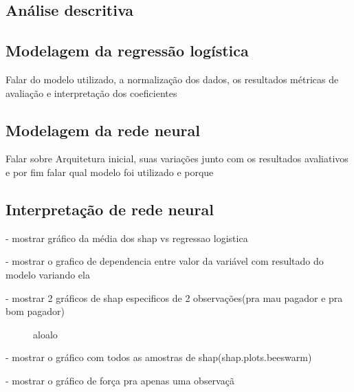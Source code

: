 \subsection*{Análise descritiva}

\subsection*{Modelagem da regressão logística}
Falar do modelo utilizado, a normalização dos dados, os resultados
métricas de avaliação e interpretação dos coeficientes

\subsection*{Modelagem da rede neural}
Falar sobre Arquitetura inicial, suas variações junto com os 
resultados avaliativos e por fim falar qual modelo foi utilizado
e porque

\subsection*{Interpretação de rede neural}

- mostrar gráfico da média dos shap vs regressao logistica

- mostrar o grafico de dependencia entre valor da variável com resultado do modelo variando ela

- mostrar 2 gráficos de shap especificos de 2 observações(pra mau pagador e pra bom pagador)
\begin{figure}
  \centering
  \vspace{.5cm}
  \vspace{.5cm}
  
  \label{fig:enter-label}
  \caption{aloalo}
\end{figure}

- mostrar o gráfico com todos as amostras de shap(shap.plots.beeswarm)


- mostrar o gráfico de força pra apenas uma observaçã

